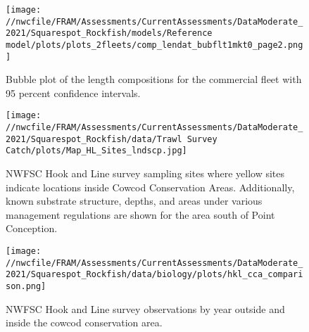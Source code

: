 \documentclass[11pt,
  english,
  a4paper,
]{article}
\begin{document}
\tagmcend\tagstructend


\begin{figure}
\centering
\texttt{[image: //nwcfile/FRAM/Assessments/CurrentAssessments/DataModerate\_2021/Squarespot\_Rockfish/models/Reference model/plots/plots\_2fleets/comp\_lendat\_bubflt1mkt0\_page2.png]}
\caption{Bubble plot of the length compositions for the commercial fleet with 95 percent confidence intervals.\label{fig:bubble-comm-len-data}}
\end{figure}

\tagmcend\tagstructend


\begin{figure}
\centering
\texttt{[image: //nwcfile/FRAM/Assessments/CurrentAssessments/DataModerate\_2021/Squarespot\_Rockfish/data/Trawl Survey Catch/plots/Map\_HL\_Sites\_lndscp.jpg]}
\caption{NWFSC Hook and Line survey sampling sites where yellow sites indicate locations inside Cowcod Conservation Areas. Additionally, known substrate structure, depths, and areas under various management regulations are shown for the area south of Point Conception.\label{fig:hkl-sites}}
\end{figure}

\tagmcend\tagstructend


\begin{figure}
\centering
\texttt{[image: //nwcfile/FRAM/Assessments/CurrentAssessments/DataModerate\_2021/Squarespot\_Rockfish/data/biology/plots/hkl\_cca\_comparison.png]}
\caption{NWFSC Hook and Line survey observations by year outside and inside the cowcod conservation area.\label{fig:hkl-cca}}
\end{figure}

\tagmcend\tagstructend
\end{document}
